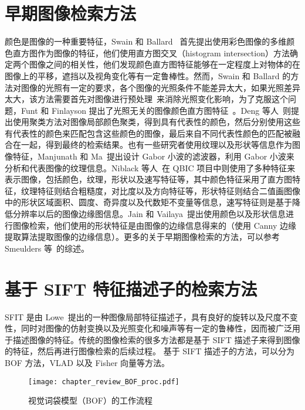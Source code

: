 \section{早期图像检索方法}
颜色是图像的一种重要特征，Swain 和 Ballard~\cite{Swain1991ColorI} 首先提出使用彩色图像的多维颜色直方图作为图像的特征，他们使用直方图交叉（histogram intersection）方法确定两个图像之间的相关性，他们发现颜色直方图特征能够在一定程度上对物体的在图像上的平移，遮挡以及视角变化等有一定鲁棒性。然而，Swain 和 Ballard 的方法对图像的光照有一定的要求，各个图像的光照条件不能差异太大，如果光照差异太大，该方法需要首先对图像进行预处理~\cite{Forsyth1990ANA}来消除光照变化影响，为了克服这个问题，Funt 和 Finlayson 提出了光照无关的图像颜色直方图特征~\cite{Funt1995ColorCC}。Deng 等人~\cite{Deng2001AnEC}则提出使用聚类方法对图像局部颜色聚类，得到具有代表性的颜色，然后分别使用这些有代表性的颜色来匹配包含这些颜色的图像，最后来自不同代表性颜色的匹配被融合在一起，得到最终的检索结果。也有一些研究者使用纹理以及形状等信息作为图像特征，Manjunath 和 Ma~\cite{Manjunath1996TextureFF}提出设计 Gabor 小波的滤波器，利用 Gabor 小波来分析和代表图像的纹理信息。Niblack 等人~\cite{Niblack1993TheQP}在 QBIC 项目中则使用了多种特征来表示图像，包括颜色，纹理，形状以及速写特征等，其中颜色特征采用了直方图特征，纹理特征则结合粗糙度，对比度以及方向特征等，形状特征则结合二值画图像中的形状区域面积、圆度、奇异度以及代数矩不变量等信息，速写特征则是基于降低分辨率以后的图像边缘图信息。Jain 和 Vailaya~\cite{Jain1996ImageRU}提出使用颜色以及形状信息进行图像检索，他们使用的形状特征是由图像的边缘信息得来的（使用 Canny 边缘提取算法提取图像的边缘信息）。更多的关于早期图像检索的方法，可以参考 Smeulders 等~\cite{Smeulders2000ContentBasedIR}的综述。


\section{基于 SIFT 特征描述子的检索方法}
SFIT 是由 Lowe~\cite{Lowe2004DistinctiveIF}提出的一种图像局部特征描述子，具有良好的旋转以及尺度不变性，同时对图像的仿射变换以及光照变化和噪声等有一定的鲁棒性，因而被广泛用于描述图像的特征。传统的图像检索的很多方法都是基于 SIFT 描述子来得到图像的特征，然后再进行图像检索的后续过程。 基于 SIFT 描述子的方法，可以分为 BOF 方法，VLAD 以及 Fisher 向量等方法。

\begin{figure}[!t]
\centering
\texttt{[image: chapter\_review\_BOF\_proc.pdf]}
\caption{视觉词袋模型（BOF）的工作流程}
\label{fig:bof_process}
\end{figure}

